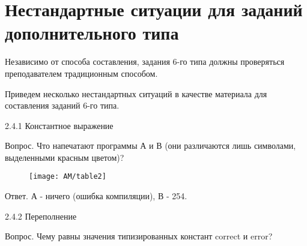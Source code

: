 \section{Нестандартные ситуации для заданий дополнительного типа}\label{AKM_ch2_4}
\hypertarget{Toc503377134}{}Независимо от способа составления, задания 6-го типа должны проверяться преподавателем
традиционным способом.

Приведем несколько нестандартных ситуаций в качестве материала для составления заданий 6-го типа.

2.4.1 Константное выражение

Вопрос. Что напечатают программы А и В (они различаются лишь символами, выделенными красным цветом)?
\begin{figure}[H]
	\centering
	\texttt{[image: AM/table2]}
\end{figure}
%
%
%
%
%
%
%
%
%
%
%
%

\bigskip

Ответ. А - ничего (ошибка компиляции), В - 254.

2.4.2 Переполнение

Вопрос. Чему равны значения типизированных констант \foreignlanguage{english}{correct} и
\foreignlanguage{english}{error}?

